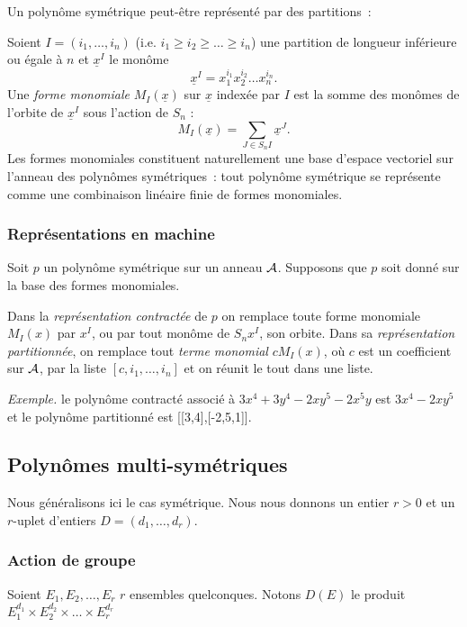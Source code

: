 Un polyn\^ome sym\'etrique peut-\^etre repr\'esent\'e par des
partitions~: 


Soient $I=(i_1,\ldots ,i_n)$ (i.e. $i_1\geq i_2\geq \ldots \geq i_n$)
une partition de longueur inf\'erieure ou
\'egale \`a $n$ et ${\underline x}^I$ le mon\^ome 
$$
{\underline x}^I = x_1^{i_1}x_2^{i_2}\ldots x_n^{i_n}.
$$
Une {\it forme monomiale} $M_I({\underline x})$ sur ${\underline x}$ 
index\'ee par $I$ est la somme des mon\^omes de l'orbite de
${\underline x}^I$ sous l'action de $S_n$ :
$$
M_I({\underline x}) =\sum_{J \in S_nI}{\underline x}^J.
$$
Les formes monomiales constituent naturellement une base d'espace vectoriel
sur l'anneau des polyn\^omes sym\'etriques~: tout
polyn\^ome sym\'etrique se repr\'esente comme une
combinaison lin\'eaire finie de formes monomiales.

\subsubsection*{Repr\'esentations en machine}

Soit $p$ un polyn\^ome sym\'etrique sur un anneau $\cal A$.
Supposons que $p$ soit donn\'e sur la base des formes monomiales.

Dans la {\it repr\'esentation contract\'ee} de $p$
on remplace toute forme monomiale $M_I(x)$ par $x^I$, ou par tout mon\^ome
de $S_nx^I$, son orbite. 
Dans sa {\it repr\'esentation partitionn\'{e}e}, on remplace tout {\it terme
monomial}  $cM_I(x)$, o\`u $c$ est un coefficient sur $\cal A$, par la liste
$[c,i_1,\ldots ,i_n]$ et on r\'eunit le tout dans une liste.

{\it Exemple.} le polyn\^{o}me contract\'{e} associ\'{e} \`{a} 
$3x^4 + 3y^4 -2xy^5 -2x^5y$ est 
$3x^4 -2xy^5$ et le polyn\^{o}me partitionn\'{e} est
[[3,4],[-2,5,1]].\\

\subsection{Polyn\^omes multi-sym\'etriques}
Nous g\'en\'eralisons ici le cas sym\'etrique.
Nous nous donnons un entier $r >0$ et un $r$-uplet d'entiers 
$D=(d_1, \ldots ,d_r)$.

\subsubsection*{Action de groupe}

Soient $E_1, E_2, \ldots ,E_r$ $r$ ensembles quelconques.
Notons $D(E)$ le produit $E_1^{d_1}\times E_2^{d_2}\times \ldots \times E_r^{d_r}$

